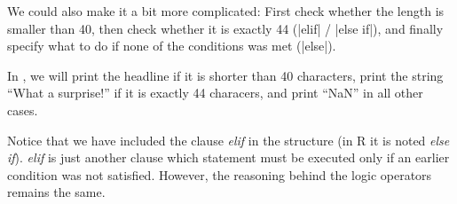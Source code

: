 
We could also make it a bit more complicated: First check whether the length is smaller than 40, then check whether it is exactly 44 (|elif| / |else if|), and finally specify what to do if none of the conditions was met (|else|).

In , we will print the headline if it is shorter than 40 characters, print the string ``What a surprise!'' if it is exactly 44 characers, and print ``NaN'' in all other cases. 


Notice that we have included the clause \emph{elif} in the structure (in R it is noted \emph{else if}). \emph{elif} is just another clause which statement must be executed only if an earlier condition was not satisfied. However, the reasoning behind the logic operators remains the same.

